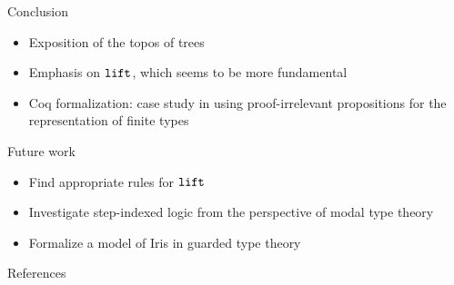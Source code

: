\documentclass{beamer}
\begin{document}
\begin{frame}{Conclusion}
\begin{itemize}
    \item Exposition of the topos of trees
    \item Emphasis on $\mathtt{lift}$, which seems to be more fundamental
    \item Coq formalization: case study in using proof-irrelevant propositions for the representation of finite types
\end{itemize}
\end{frame}

\begin{frame}{Future work}
\begin{itemize}
    \item Find appropriate rules for $\mathtt{lift}$
    \item Investigate step-indexed logic from the perspective of modal type theory
    \item Formalize a model of Iris in guarded type theory
\end{itemize}
\end{frame}

\begin{frame}{References}


\end{frame}
\end{document}
